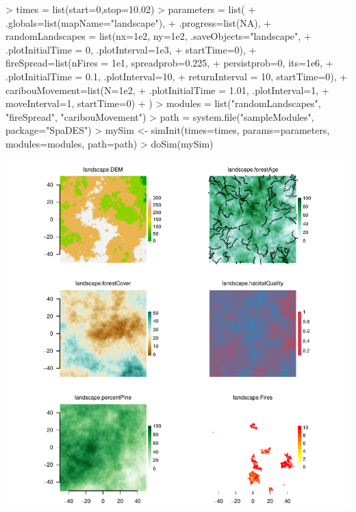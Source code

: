 \documentclass{article}
\begin{document}
\begin{Schunk}
\begin{Sinput}
> times = list(start=0,stop=10.02)
> parameters = list(
+                    .globals=list(mapName="landscape"),
+                    .progress=list(NA),
+                    randomLandscapes = list(nx=1e2, ny=1e2, .saveObjects="landscape",
+                                            .plotInitialTime = 0, .plotInterval=1e3,
+                                            startTime=0),
+                    fireSpread=list(nFires = 1e1, spreadprob=0.225,
+                                    persistprob=0, its=1e6,
+                                    .plotInitialTime = 0.1, .plotInterval=10,
+                                    returnInterval = 10, startTime=0),
+                    caribouMovement=list(N=1e2,
+                                 .plotInitialTime = 1.01, .plotInterval=1,
+                                 moveInterval=1, startTime=0)
+                  )
> modules = list("randomLandscapes", "fireSpread", "caribouMovement")
> path = system.file("sampleModules", package="SpaDES")
> mySim <- simInit(times=times, params=parameters, modules=modules, path=path)
> doSim(mySim)
\end{Sinput}
\end{Schunk}
\includegraphics{introduction-using-SpaDES}
\end{document}
